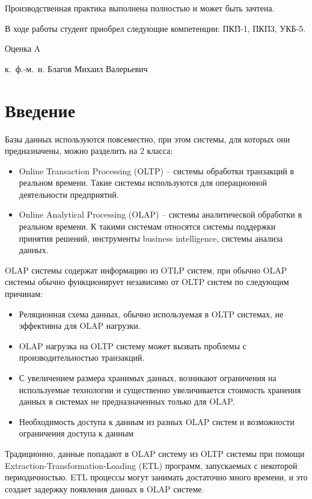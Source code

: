 \documentclass[%
bachelor,    %
subf,        %
href,        %
colorlinks,  %
]{disser}
\begin{document}
	
	Производственная практика выполнена полностью и может быть зачтена.
	
	В ходе работы студент приобрел следующие компетенции: ПКП-1, ПКП3, УКБ-5.
	
	Оценка A
	\begin{flushright}
		к.~ф.-м.~н. Благов Михаил Валерьевич
	\end{flushright}
	
	\tableofcontents
	
	
	\section{Введение}
	
	Базы данных используются повсеместно, при этом системы, для которых они предназначены, можно разделить на 2 класса:\cite{oltp_olap_2}
	\begin{itemize}
		\item Online Transaction Processing (OLTP) -- системы обработки транзакций в реальном времени. Такие системы используются для операционной деятельности предприятий.
		\item Online Analytical Processing (OLAP) -- системы аналитической обработки в реальном времени. К такими системам относятся системы поддержки принятия решений, инструменты business intelligence, системы анализа данных.
	\end{itemize}
	
	OLAP системы содержат информацию из OTLP систем, при обычно OLAP системы обычно функционирует независимо от OLTP систем по следующим причинам:\cite{oltp_olap}
	\begin{itemize}
		\item Реляционная схема данных, обычно используемая в OLTP системах, не эффективна для OLAP нагрузки.
		\item OLAP нагрузка на OLTP систему может вызвать проблемы с производительностью транзакций.
		\item С увеличением размера хранимых данных, возникают ограничения на используемые технологии и существенно увеличивается стоимость хранения данных в системах не предназначенных только для OLAP.
		\item Необходимость доступа к данным из разных OLAP систем и возможности ограничения доступа к данным
	\end{itemize}
	
	Традиционно, данные попадают в OLAP систему из OLTP системы при помощи Extraction-Transformation-Loading (ETL) программ,
	запускаемых с некоторой периодичностью. ETL процессы могут занимать достаточно много времени, и это создает задержку появления данных в OLAP системе. 
	
\end{document}
